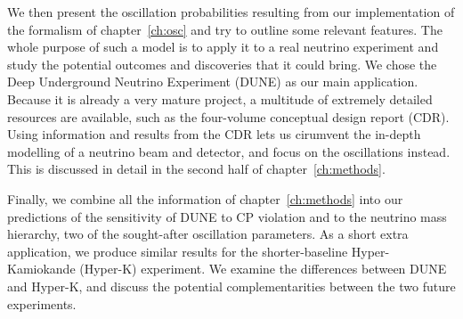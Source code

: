 We then present the oscillation probabilities resulting from our
implementation of the formalism of chapter~\ref{ch:osc} and try to outline some
relevant features. 
The whole purpose of such a model is to apply it to a real neutrino experiment
and study the potential outcomes and discoveries that it could bring.
We chose the Deep Underground Neutrino Experiment (DUNE) as our main
application. Because it is already a very mature project, a multitude of
extremely detailed resources are available, such as the four-volume conceptual
design report\cite{cdr-all} (CDR). Using information and results from the CDR
lets us cirumvent the in-depth modelling of a neutrino beam and detector, and
focus on the oscillations instead. This is discussed in detail in the second
half of chapter~\ref{ch:methods}.

Finally, we combine all the information of chapter~\ref{ch:methods} into our
predictions of the sensitivity of DUNE to CP violation and to the neutrino mass
hierarchy, two of the sought-after oscillation parameters.
As a short extra application, we produce similar results for the shorter-baseline
Hyper-Kamiokande (Hyper-K) experiment. We examine the differences between DUNE
and Hyper-K, and discuss the potential complementarities between the two
future experiments.

